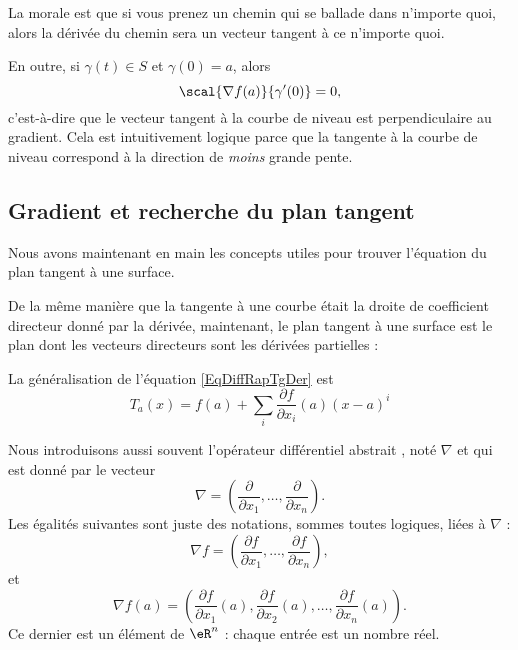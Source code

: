 La morale est que si vous prenez un chemin qui se ballade dans n'importe quoi, alors la dérivée du chemin sera un vecteur tangent à ce n'importe quoi.

En outre, si $\gamma(t)\in S$ et $\gamma(0)=a$, alors
\begin{equation}
	\scal{\nabla f(a)}{\gamma'(0)}=0,
\end{equation}
c'est-à-dire que le vecteur tangent à la courbe de niveau est perpendiculaire au gradient. Cela est intuitivement logique parce que la tangente à la courbe de niveau correspond à la direction de \emph{moins} grande pente.

\subsection{Gradient et recherche du plan tangent}

Nous avons maintenant en main les concepts utiles pour trouver l'équation du plan tangent à une surface.

De la même manière que la tangente à une courbe était la droite de coefficient directeur donné par la dérivée, maintenant, le plan tangent à une surface est le plan dont les vecteurs directeurs sont les dérivées partielles :

La généralisation de l'équation \eqref{EqDiffRapTgDer} est
\begin{equation}        \label{EqDefPlanTag}
	T_a(x)=f(a)+\sum_i\frac{ \partial f }{ \partial x_i }(a)(x-a)^i
\end{equation}

Nous introduisons aussi souvent l'opérateur différentiel abstrait , noté $\nabla$ et qui est donné par le vecteur
\begin{equation}
	\nabla=\left( \frac{ \partial  }{ \partial x_1 },\ldots,\frac{ \partial  }{ \partial x_n } \right).
\end{equation}
Les égalités suivantes sont juste des notations, sommes toutes logiques, liées à $\nabla$ :
\begin{equation}
	\nabla f=\left( \frac{ \partial f }{ \partial x_1 },\ldots,\frac{ \partial f }{ \partial x_n } \right),
\end{equation}
et
\begin{equation}        \label{EqDefGradient}
	\nabla f(a) = \left(\frac{\partial f}{\partial x_1}(a), \frac{\partial f}{\partial x_2}(a), \ldots, \frac{\partial f}{\partial x_n}(a)\right).
\end{equation}
Ce dernier est un élément de $\eR^n$ : chaque entrée est un nombre réel.

